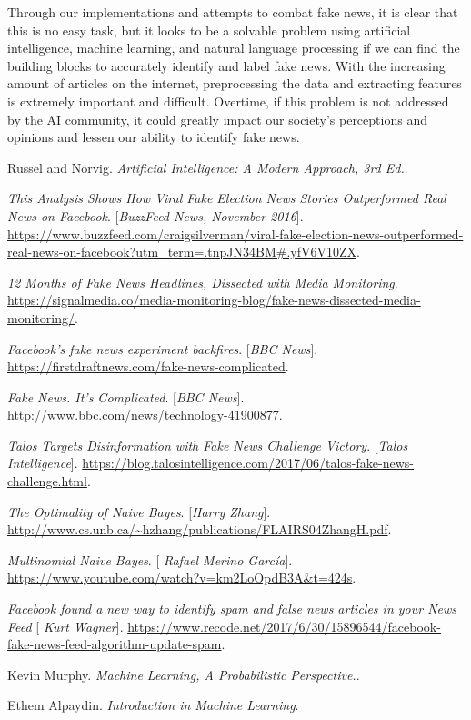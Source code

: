 \documentclass{neu_handout}
\begin{document}
Through our implementations and attempts to combat fake news, it is clear that this is no easy task, but it looks to be a solvable problem using artificial intelligence, machine learning, and natural language processing if we can find the building blocks to accurately identify and label fake news. With the increasing amount of articles on the internet, preprocessing the data and extracting features is extremely important and difficult. Overtime, if this problem is not addressed by the AI community, it could greatly impact our society's perceptions and opinions and lessen our ability to identify fake news.


\begin{thebibliography}{9}

Russel and Norvig. 
\textit{Artificial Intelligence: A Modern Approach, 3rd Ed.}. 

 
\textit{This Analysis Shows How Viral Fake Election News Stories Outperformed Real News on Facebook}.
[\textit{BuzzFeed News, November 2016}].
\url{https://www.buzzfeed.com/craigsilverman/viral-fake-election-news-outperformed-real-news-on-facebook?utm_term=.tnpJN34BM#.yfV6V10ZX}.
 

\textit{12 Months of Fake News Headlines, Dissected with Media Monitoring}. 
 \url{https://signalmedia.co/media-monitoring-blog/fake-news-dissected-media-monitoring/}.

\textit{Facebook's fake news experiment backfires}.
[\textit{BBC News}]. 
 \url{https://firstdraftnews.com/fake-news-complicated}.
 
 
\textit{Fake News. It's Complicated}.
[\textit{BBC News}]. 
 \url{http://www.bbc.com/news/technology-41900877}.
 
\textit{Talos Targets Disinformation with Fake News Challenge Victory}.
[\textit{Talos Intelligence}]. 
 \url{https://blog.talosintelligence.com/2017/06/talos-fake-news-challenge.html}.
 
\textit{The Optimality of Naive Bayes}.
[\textit{Harry Zhang}]. 
 \url{http://www.cs.unb.ca/~hzhang/publications/FLAIRS04ZhangH.pdf}.
 
 
\textit{Multinomial Naive Bayes}.
[\textit{
Rafael Merino García}]. 
 \url{https://www.youtube.com/watch?v=km2LoOpdB3A&t=424s}.
 
\textit{Facebook found a new way to identify spam and false news articles in your News Feed}
[\textit{
Kurt Wagner}]. 
 \url{https://www.recode.net/2017/6/30/15896544/facebook-fake-news-feed-algorithm-update-spam}.

Kevin Murphy. 
\textit{Machine Learning, A Probabilistic Perspective.}.

Ethem Alpaydin. 
\textit{Introduction in Machine Learning}.

\end{thebibliography}
\end{document}
